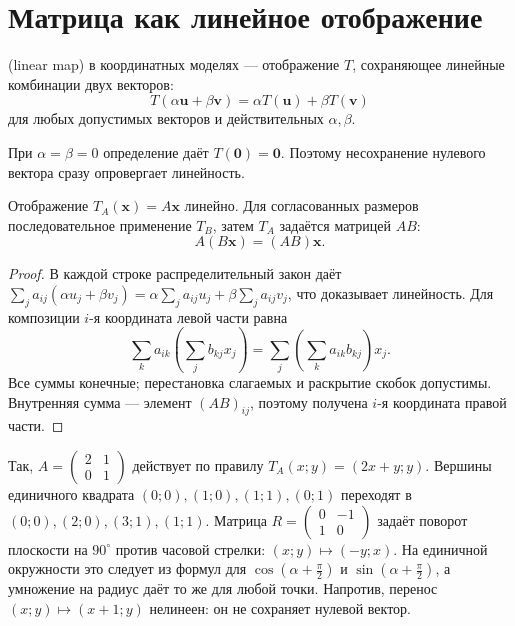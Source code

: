 \section{Матрица как линейное отображение}
\begin{definition}
 (linear map) в координатных моделях — отображение \(T\), сохраняющее линейные комбинации двух векторов:
\[
T(\alpha\symbf u+\beta\symbf v)
=\alpha T(\symbf u)+\beta T(\symbf v)
\]
для любых допустимых векторов и действительных \(\alpha,\beta\).
\end{definition}
При \(\alpha=\beta=0\) определение даёт \(T(\symbf0)=\symbf0\). Поэтому несохранение нулевого вектора сразу опровергает линейность.
\begin{theorem}\label{thm:legacy-c18-1}
Отображение \(T_A(\symbf x)=A\symbf x\) линейно. Для согласованных размеров последовательное применение \(T_B\), затем \(T_A\) задаётся матрицей \(AB\):
\[
A(B\symbf x)=(AB)\symbf x.
\]
\end{theorem}
\begin{proof}
В каждой строке распределительный закон даёт
\(\sum_j a_{ij}(\alpha u_j+\beta v_j)=\alpha\sum_j a_{ij}u_j+\beta\sum_j a_{ij}v_j\), что доказывает линейность. Для композиции \(i\)-я координата левой части равна
\[
\sum_k a_{ik}\left(\sum_j b_{kj}x_j\right)
=\sum_j\left(\sum_k a_{ik}b_{kj}\right)x_j.
\]
Все суммы конечные; перестановка слагаемых и раскрытие скобок допустимы. Внутренняя сумма — элемент \((AB)_{ij}\), поэтому получена \(i\)-я координата правой части.
\end{proof}
Так, \(A=\begin{pmatrix}2&1\\0&1\end{pmatrix}\) действует по правилу \(T_A(x;y)=(2x+y;y)\). Вершины единичного квадрата \((0;0),(1;0),(1;1),(0;1)\) переходят в \((0;0),(2;0),(3;1),(1;1)\). Матрица \(R=\begin{pmatrix}0&-1\\1&0\end{pmatrix}\) задаёт поворот плоскости на \(90^\circ\) против часовой стрелки: \((x;y)\mapsto(-y;x)\). На единичной окружности это следует из формул для \(\cos(\alpha+\frac\pi2)\) и \(\sin(\alpha+\frac\pi2)\), а умножение на радиус даёт то же для любой точки. Напротив, перенос \((x;y)\mapsto(x+1;y)\) нелинеен: он не сохраняет нулевой вектор.

